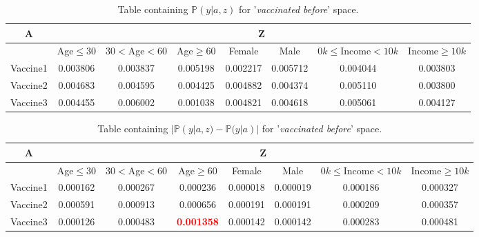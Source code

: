 \documentclass{article}
\begin{document}
\begin{center}
    \begin{table}[H]
    \begin{adjustbox}{max width=\textwidth}
        \begin{tabular}{ |c| c c c c c c c|}
            \hline
            A  & \multicolumn{7}{c|}{Z} \\
            \hline
            & Age$\leq30$ &    $30<$Age$<60$ &     Age$\geq60$ &    Female &      Male &   $0k\leq$Income$<10k$ &    Income$\geq10k$  \\
            \hline
            Vaccine1 &  0.003806 &  0.003837 &  0.005198 &  0.002217 &  0.005712 &  0.004044 &  0.003803 \\
            Vaccine2 &  0.004683 &  0.004595 &  0.004425 &  0.004882 &  0.004374 &  0.005110 &  0.003800 \\
            Vaccine3 &  0.004455 &  0.006002 &  0.001038 &  0.004821 &  0.004618 &  0.005061 &  0.004127 
            \\ \hline
        \end{tabular}
        \end{adjustbox}
    \caption{Table containing $\mathbb{P}(y | a, z)$ for '\textit{vaccinated before}' space.}
    \label{tab:pyaz vaccinated before}
    \end{table}
\end{center}

\begin{center}
\begin{table}[H]
\begin{adjustbox}{max width=\textwidth}
    \begin{tabular}{ |c| c c c c c c c|}
        \hline
          A  & \multicolumn{7}{c|}{Z} \\
          \hline
          & Age$\leq30$ &    $30<$Age$<60$ &     Age$\geq60$ &    Female &      Male &   $0k\leq$Income$<10k$ &    Income$\geq10k$  \\
        \hline
        Vaccine1 &  0.000162 &  0.000267 &  0.000236 &  0.000018 &  0.000019 &  0.000186 &  0.000327 \\
        Vaccine2 &  0.000591 &  0.000913 &  0.000656 &  0.000191 &  0.000191 &  0.000209 &  0.000357 \\
        Vaccine3 &  0.000126 &  0.000483 &  \textbf{\textcolor{red}{0.001358}} &  0.000142 &  0.000142 &  0.000283 &  0.000481
         \\ \hline
    \end{tabular}
    \end{adjustbox}
    \caption{Table containing $| \mathbb{P}(y | a, z) - \mathbb{P}(y | a) |$ for '\textit{vaccinated before}' space.}
    \label{tab:diff2}
\end{table}
\end{center}
\end{document}
